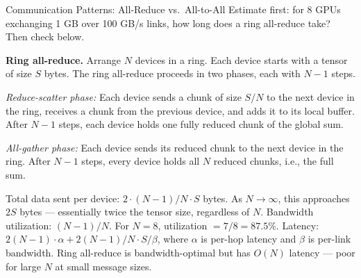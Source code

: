 \begin{thinkfirst}{Communication Patterns: All-Reduce vs.\ All-to-All}
Estimate first: for 8 GPUs exchanging 1 GB over 100 GB/s links, how long does a ring all-reduce take? Then check below.

\medskip
\textbf{Ring all-reduce.}
Arrange $N$ devices in a ring.
Each device starts with a tensor of size $S$ bytes.
The ring all-reduce proceeds in two phases, each with $N-1$ steps.

\emph{Reduce-scatter phase:} Each device sends a chunk of size $S/N$ to the next device in the ring,
receives a chunk from the previous device, and adds it to its local buffer.
After $N-1$ steps, each device holds one fully reduced chunk of the global sum.

\emph{All-gather phase:} Each device sends its reduced chunk to the next device in the ring.
After $N-1$ steps, every device holds all $N$ reduced chunks, i.e., the full sum.

Total data sent per device: $2 \cdot (N-1)/N \cdot S$ bytes.
As $N \to \infty$, this approaches $2S$ bytes --- essentially twice the tensor size, regardless of $N$.
Bandwidth utilization: $(N-1)/N$.
For $N=8$, utilization $= 7/8 = 87.5\%$.
Latency: $2(N-1) \cdot \alpha + 2(N-1)/N \cdot S / \beta$,
where $\alpha$ is per-hop latency and $\beta$ is per-link bandwidth.
Ring all-reduce is bandwidth-optimal but has $O(N)$ latency --- poor for large $N$ at small message sizes.

\begin{center}
\end{center}
\end{thinkfirst}
